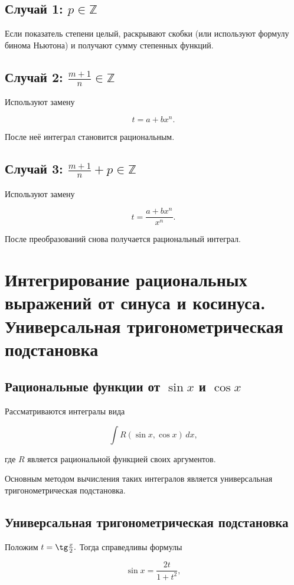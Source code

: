 \documentclass[14pt]{extreport}
\begin{document}
\section{Случай 1:
$p\in\mathbb Z$}

Если показатель степени целый, раскрывают скобки
(или используют формулу бинома Ньютона)
и получают сумму степенных функций.

\section{Случай 2:
$\frac{m+1}{n}\in\mathbb Z$}

Используют замену

\[
t=a+bx^n.
\]

После неё интеграл становится рациональным.
\newpage
\section{Случай 3:
$\frac{m+1}{n}+p\in\mathbb Z$}

Используют замену

\[
t=\frac{a+bx^n}{x^n}.
\]

После преобразований снова получается рациональный интеграл.
\chapter{Интегрирование рациональных выражений от синуса и косинуса.
Универсальная тригонометрическая подстановка}

\section{Рациональные функции от $\sin x$ и $\cos x$}

Рассматриваются интегралы вида

\[
\int R(\sin x,\cos x)\,dx,
\]

где $R$ является рациональной функцией своих аргументов.

Основным методом вычисления таких интегралов является
универсальная тригонометрическая подстановка.

\section{Универсальная тригонометрическая подстановка}

Положим 
$t=\tg\frac{x}{2}.$
Тогда справедливы формулы

\[
\sin x=\frac{2t}{1+t^2},
\]
\end{document}
